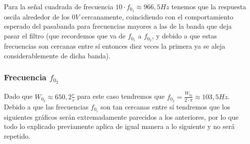 \documentclass[11pt,a4paper]{report}
\begin{document}
Para la señal cuadrada de frecuencia $10 \cdot f_{0_{1}} \approx 966,5Hz$ tenemos que la respuesta oscila alrededor de los $0V$ cercanamente, coincidiendo con el comportamiento esperado del pasabanda para frecuencias mayores a las de la banda que deja pasar el filtro (que recordemos que va de $f_{0_{1}}$ a $f_{0_{2}}$, y debido a que estas frecuencias son cercanas entre sí entonces diez veces la primera ya se aleja considerablemente de dicha banda).

\subsubsection*{Frecuencia $f_{0_{2}}$}

Dado que $W_{0_{2}} \approx 650,2\frac{r}{s}$ para este caso tendremos que $f_{0_{2}} = \frac{W_{0_{2}}}{2 \cdot \pi} \approx 103,5Hz$. Debido a que las frecuencias $f_{0_{i}}$ son tan cercanas entre sí tendremos que los siguientes gráficos serán extremadamente parecidos a los anteriores, por lo que todo lo explicado previamente aplica de igual manera a lo siguiente y no será repetido.
\end{document}

